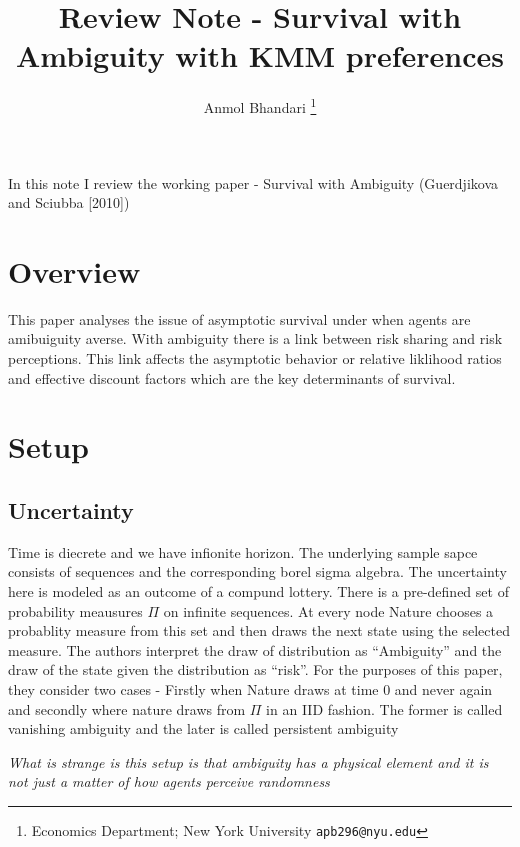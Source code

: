 \documentclass[12pt]{article}
\begin{document}
\title{Review Note  - Survival with Ambiguity with KMM preferences}
\author{Anmol Bhandari \thanks{Economics Department; New York University \texttt{apb296@nyu.edu}}}
\maketitle
In this note I review the working paper  - Survival with Ambiguity (Guerdjikova and Sciubba [2010])
\newpage
\section{Overview}
This paper analyses the issue of asymptotic survival under when agents are amibuiguity averse. With ambiguity there is a link between risk sharing and risk perceptions. This link affects the asymptotic behavior or relative liklihood ratios and effective discount factors which are the key determinants of survival.

\section{Setup}
\subsection{Uncertainty}
\noindent Time is diecrete and we have infionite horizon. The underlying sample sapce consists of sequences and the corresponding borel sigma algebra. The uncertainty here is modeled as an outcome of a compund lottery. There is a pre-defined set of probability meausures $\Pi$ on infinite sequences. At every node Nature chooses a probablity measure from this set and then draws the next state using the selected measure. The authors interpret the draw of distribution as ``Ambiguity'' and the draw of the state given the distribution as ``risk''. For the purposes of this paper, they consider two cases - Firstly when Nature draws at time 0 and never again and secondly where nature draws from $\Pi$ in an IID fashion. The former is called vanishing ambiguity and the later is called persistent ambiguity

\noindent \emph{What is strange is this setup is that ambiguity has a physical element and it is not just a matter of how agents perceive randomness}
\end{document}
